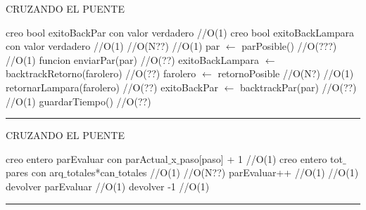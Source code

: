 \begin{algorithm}[H]
\caption{CRUZANDO EL PUENTE}
\begin{algorithmic}[1]
\state creo bool exitoBackPar con valor verdadero \hfill //O(1)
\state creo bool exitoBackLampara con valor verdadero \hfill //O(1)
 \hfill //O(N??)
 \hfill //O(1)
\state par $\gets$ parPosible() \hfill //O(???)
 \hfill //O(1)
\state funcion enviarPar(par) \hfill //O(??)
\Else
\state exitoBackLampara $\gets$ backtrackRetorno(farolero) \hfill //O(??)
\endif
\Else
\state farolero $\gets$ retornoPosible \hfill //O(N?)
 \hfill //O(1)
\state retornarLampara(farolero) \hfill //O(??)
\Else
\state exitoBackPar $\gets$ backtrackPar(par) \hfill //O(??)
\endif
\endif
{} \hfill //O(1)
\state guardarTiempo() \hfill //O(??)
\endif
\endwhile
\EndFunction 
\end{algorithmic}
\hrule
{}
\end{algorithm}


\begin{algorithm}[H]
\caption{CRUZANDO EL PUENTE}
\begin{algorithmic}[1]
\state creo entero parEvaluar con parActual$\_$x$\_$paso[paso] + 1 \hfill //O(1)
\state creo entero tot$\_$pares con arq$\_$totales*can$\_$totales \hfill //O(1)
 \hfill //O(N??)
\state parEvaluar++ \hfill //O(1)
\endwhile
{} \hfill //O(1)
\state devolver  parEvaluar \hfill //O(1)
\Else
\state devolver -1 \hfill //O(1)
\endif
\EndFunction 
\end{algorithmic}
\hrule
{}
\end{algorithm}

